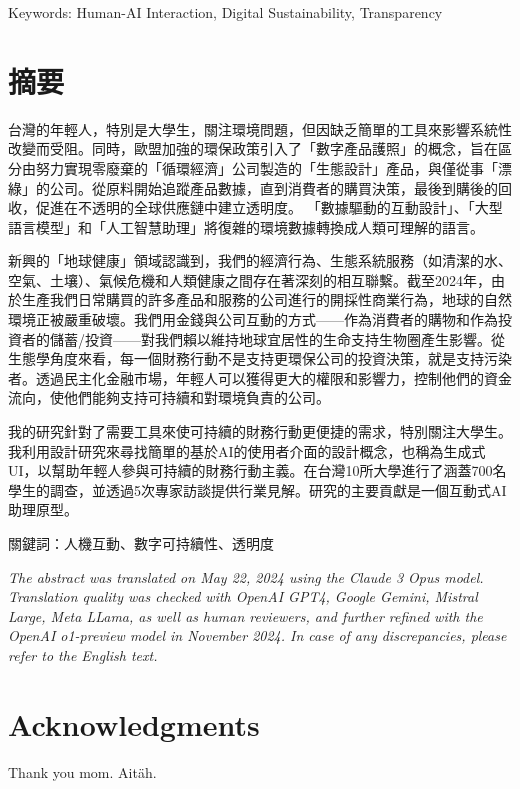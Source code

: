 \documentclass[
  12pt,
  letterpaper,
  DIV=11,
  numbers=noendperiod]{scrartcl}
\begin{document}
Keywords: Human-AI Interaction, Digital Sustainability, Transparency

\newpage

\section{摘要}\label{ux6458ux8981}

台灣的年輕人，特別是大學生，關注環境問題，但因缺乏簡單的工具來影響系統性改變而受阻。同時，歐盟加強的環保政策引入了「數字產品護照」的概念，旨在區分由努力實現零廢棄的「循環經濟」公司製造的「生態設計」產品，與僅從事「漂綠」的公司。從原料開始追蹤產品數據，直到消費者的購買決策，最後到購後的回收，促進在不透明的全球供應鏈中建立透明度。
「數據驅動的互動設計」、「大型語言模型」和「人工智慧助理」將復雜的環境數據轉換成人類可理解的語言。

新興的「地球健康」領域認識到，我們的經濟行為、生態系統服務（如清潔的水、空氣、土壤）、氣候危機和人類健康之間存在著深刻的相互聯繫。截至2024年，由於生產我們日常購買的許多產品和服務的公司進行的開採性商業行為，地球的自然環境正被嚴重破壞。我們用金錢與公司互動的方式------作為消費者的購物和作為投資者的儲蓄/投資------對我們賴以維持地球宜居性的生命支持生物圈產生影響。從生態學角度來看，每一個財務行動不是支持更環保公司的投資決策，就是支持污染者。透過民主化金融市場，年輕人可以獲得更大的權限和影響力，控制他們的資金流向，使他們能夠支持可持續和對環境負責的公司。

我的研究針對了需要工具來使可持續的財務行動更便捷的需求，特別關注大學生。我利用設計研究來尋找簡單的基於AI的使用者介面的設計概念，也稱為生成式UI，以幫助年輕人參與可持續的財務行動主義。在台灣10所大學進行了涵蓋700名學生的調查，並透過5次專家訪談提供行業見解。研究的主要貢獻是一個互動式AI助理原型。

關鍵詞：人機互動、數字可持續性、透明度

\emph{The abstract was translated on May 22, 2024 using the Claude 3
Opus model. Translation quality was checked with OpenAI GPT4, Google
Gemini, Mistral Large, Meta LLama, as well as human reviewers, and
further refined with the OpenAI o1-preview model in November 2024. In
case of any discrepancies, please refer to the English text.}

\newpage

\section{Acknowledgments}\label{acknowledgments}

Thank you mom. Aitäh.
\end{document}
